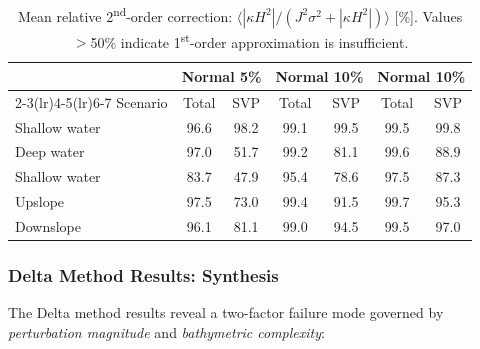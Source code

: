 \documentclass[11pt,a4paper]{article}
\begin{document}
\begin{table}[H]
  \centering
  \caption{Mean relative 2\textsuperscript{nd}-order correction:
           $\langle|\kappa H^2|/(J^2\sigma^2 + |\kappa H^2|)\rangle$ [\%].
           Values $>$50\% indicate 1\textsuperscript{st}-order approximation is insufficient.}
  \label{tab:2nd_order_correction}
  \begin{tabular}{lcccccc}
    \toprule
    & \multicolumn{2}{c}{Normal 5\%} & \multicolumn{2}{c}{Normal 10\%}
    & \multicolumn{2}{c}{Normal 10\%} \\
    \cmidrule(lr){2-3}\cmidrule(lr){4-5}\cmidrule(lr){6-7}
    Scenario & Total & SVP & Total & SVP & Total & SVP \\
    \midrule
    Shallow water & 96.6 & 98.2 & 99.1 & 99.5 & 99.5 & 99.8 \\
    Deep water    & 97.0 & 51.7 & 99.2 & 81.1 & 99.6 & 88.9 \\
    Shallow water & 83.7 & 47.9 & 95.4 & 78.6 & 97.5 & 87.3 \\
    Upslope       & 97.5 & 73.0 & 99.4 & 91.5 & 99.7 & 95.3 \\
    Downslope     & 96.1 & 81.1 & 99.0 & 94.5 & 99.5 & 97.0 \\
    \bottomrule
  \end{tabular}
\end{table}

\subsubsection{Delta Method Results: Synthesis}
\label{sec:delta_synthesis}

The Delta method results reveal a two-factor failure mode governed by
\emph{perturbation magnitude} and \emph{bathymetric complexity}:
\end{document}
